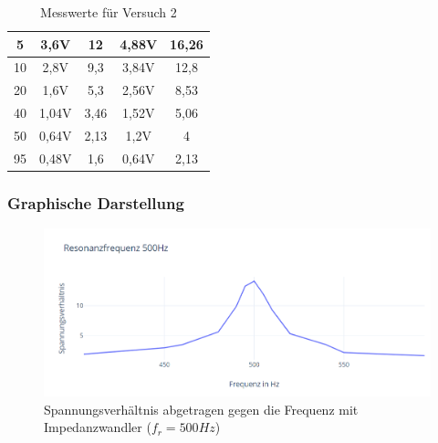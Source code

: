 \documentclass{article}
\begin{document}
\begin{table}[h]
\begin{center}
\begin{tabular}{|c|c|c|c|c|}
      \hline
      5          & 3,6V                                              & 12                                             & 4,88V       & 16,26                             \\
      \hline
      10         & 2,8V                                              & 9,3                                            & 3,84V       & 12,8                              \\
      \hline
      20         & 1,6V                                              & 5,3                                            & 2,56V       & 8,53                              \\
      \hline
      40         & 1,04V                                             & 3,46                                           & 1,52V       & 5,06                              \\
      \hline
      50         & 0,64V                                             & 2,13                                           & 1,2V        & 4                                 \\
      \hline
      95         & 0,48V                                             & 1,6                                            & 0,64V       & 2,13                              \\
      \hline
    \end{tabular}
    \caption{Messwerte für Versuch 2}
    \label{tab:MV2}
  \end{center}
\end{table}

\subsubsection{Graphische Darstellung}
\begin{figure}[h!]
  \begin{center}
    \includegraphics[scale=0.75]{../assets/images/ETP3/Fre500Plot3.PNG}
    \caption{Spannungsverhältnis abgetragen gegen die Frequenz mit Impedanzwandler ($f_r = 500Hz$)}
  \end{center}
\end{figure}
\end{document}

